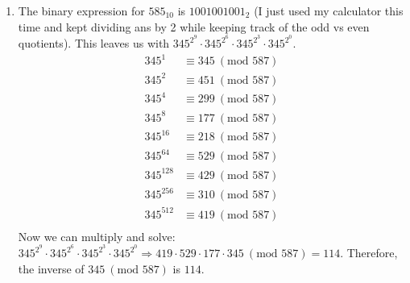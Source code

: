 {\begin{enumerate}
\begin{enumerate}[label=(\roman*)]
                  \item The binary expression for \(585_{10}\) is \(1001001001_2\) (I just used my calculator this time and kept dividing ans by 2 while keeping track of the odd vs even quotients). This leaves us with \(345^{2^9} \cdot 345^{2^6} \cdot 345^{2^3} \cdot 345^{2^0}\).
                        \begin{align*}
                            345^1     & \equiv 345 \ (\text{mod } 587) \\
                            345^2     & \equiv 451 \ (\text{mod } 587) \\
                            345^4     & \equiv 299 \ (\text{mod } 587) \\
                            345^8     & \equiv 177 \ (\text{mod } 587) \\
                            345^{16}  & \equiv 218 \ (\text{mod } 587) \\
                            345^{64}  & \equiv 529 \ (\text{mod } 587) \\
                            345^{128} & \equiv 429 \ (\text{mod } 587) \\
                            345^{256} & \equiv 310 \ (\text{mod } 587) \\
                            345^{512} & \equiv 419 \ (\text{mod } 587) \\
                        \end{align*}
                        Now we can multiply and solve: \(345^{2^9} \cdot 345^{2^6} \cdot 345^{2^3} \cdot 345^{2^0} \Rightarrow 419 \cdot 529 \cdot 177 \cdot 345 \ (\text{mod } 587) = 114\). Therefore, the inverse of \(345 \ (\text{mod } 587)\) is \(114\).
              \end{enumerate}
    \end{enumerate}
}

